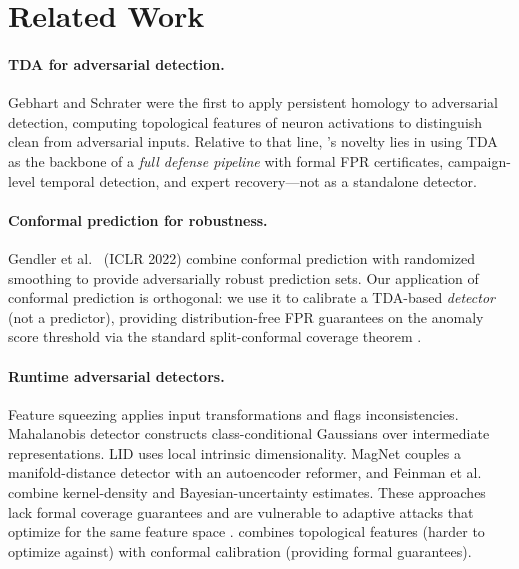 \section{Related Work}
\label{sec:related}

\paragraph{TDA for adversarial detection.}
Gebhart and Schrater \cite{gebhart2019adversary} were the first to apply
persistent homology to adversarial detection, computing topological
features of neuron activations to distinguish clean from adversarial
inputs.
Relative to that line, \prism's novelty lies in using TDA as the backbone
of a \emph{full defense pipeline} with formal FPR certificates,
campaign-level temporal detection, and expert recovery---not as a
standalone detector.

\paragraph{Conformal prediction for robustness.}
Gendler et al.\ \cite{gendler2022adversarially} (ICLR 2022) combine
conformal prediction with randomized smoothing to provide adversarially
robust prediction sets.
Our application of conformal prediction is orthogonal: we use it to
calibrate a TDA-based \emph{detector} (not a predictor), providing
distribution-free FPR guarantees on the anomaly score threshold via the
standard split-conformal coverage theorem \cite{vovk2005algorithmic,angelopoulos2023gentle}.

\paragraph{Runtime adversarial detectors.}
Feature squeezing \cite{xu2018feature} applies input transformations and 
flags inconsistencies.
Mahala\-nobis detector \cite{lee2018simple} constructs class-conditional 
Gaussians over intermediate representations.
LID \cite{ma2018characterizing} uses local intrinsic dimensionality.
MagNet \cite{meng2017magnet} couples a manifold-distance detector with an
autoencoder reformer, and Feinman et al.\ \cite{feinman2017detecting} combine
kernel-density and Bayesian-uncertainty estimates.
These approaches lack formal coverage guarantees and are vulnerable to
adaptive attacks that optimize for the same feature space \cite{carlini2017adversarial}.
\prism combines topological features (harder to optimize against) with 
conformal calibration (providing formal guarantees).

